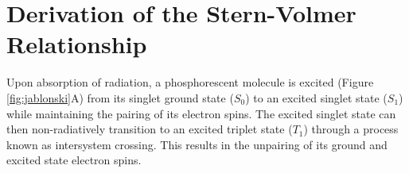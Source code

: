 
\chapter{Derivation of the Stern-Volmer Relationship} \label{app:stern_volmer}

Upon absorption of radiation, a phosphorescent molecule is excited (Figure \ref{fig:jablonski}A) from its singlet ground state ($S_0$) to an excited singlet state ($S_1$) while maintaining the pairing of its electron spins. The excited singlet state can then non-radiatively transition to an excited triplet state ($T_1$) through a process known as intersystem crossing. This results in the unpairing of its ground and excited state electron spins.

